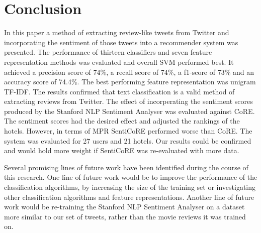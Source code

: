 \section{Conclusion}

In this paper a method of extracting review-like tweets from Twitter and incorporating the sentiment of those tweets into a recommender system was presented. The performance of thirteen classifiers and seven feature representation methods was evaluated and overall SVM performed best. It achieved a precision score of 74\%, a recall score of 74\%, a f1-score of 73\% and an accuracy score of 74.4\%. The best performing feature representation was unigram TF-IDF. The results confirmed that text classification is a valid method of extracting reviews from Twitter. The effect of incorperating the sentiment scores produced by the Stanford NLP Sentiment Analyser was evaluated against CoRE. The sentiment scores had the desired effect and adjusted the rankings of the hotels. However, in terms of MPR SentiCoRE performed worse than CoRE. The system was evaluated for 27 users and 21 hotels. Our results could be confirmed and would hold more weight if SentiCoRE was re-evaluated with more data.

Several promising lines of future work have been identified during the course of this research. One line of future work would be to improve the performance of the classification algorithms, by increasing the size of the training set or investigating other classification algorithms and feature representations. Another line of future work would be re-training the Stanford NLP Sentiment Analyser on a dataset more similar to our set of tweets, rather than the movie reviews it was trained on. 

